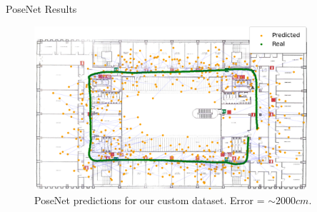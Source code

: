 \documentclass[
    center,
]{beamer}
\begin{document}
\begin{frame}{PoseNet Results}
    \begin{figure}
        \centering
        \includegraphics[width=0.9\textwidth]{../imgs/posenet_map.png}
        \caption{PoseNet predictions for our custom dataset. Error = $\sim 2000cm$.}
    \end{figure}
\end{frame}

\end{document}
